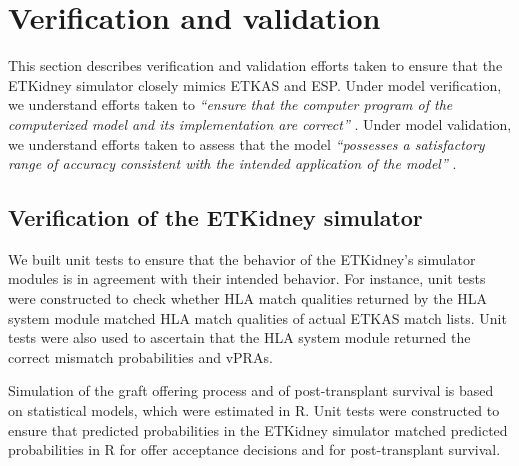 \section{Verification and validation}
\label{sec:validation}
This section describes verification and validation efforts taken to ensure that the ETKidney simulator closely mimics ETKAS and ESP. Under model verification, we understand efforts taken to \textit{\enquote{ensure that the computer program of the computerized model and its implementation are correct}} \cite{sargent2020}. Under model validation, we understand efforts taken to assess that the model \textit{\enquote{possesses a satisfactory range of accuracy consistent with the intended application of the model}} \cite{sargent2020}. 

\subsection{Verification of the ETKidney simulator}
\label{section:verification}
We built unit tests to ensure that the behavior of the ETKidney's simulator modules is in agreement with their intended behavior. For instance, unit tests were constructed to check whether HLA match qualities returned by the HLA system module matched HLA match qualities of actual ETKAS match lists. Unit tests were also used to ascertain that the HLA system module returned the correct mismatch probabilities and vPRAs. %

\par
Simulation of the graft offering process and of post-transplant survival is based on statistical models, which were estimated in R. Unit tests were constructed to ensure that predicted probabilities in the ETKidney simulator matched predicted probabilities in R for offer acceptance decisions and for post-transplant survival.

